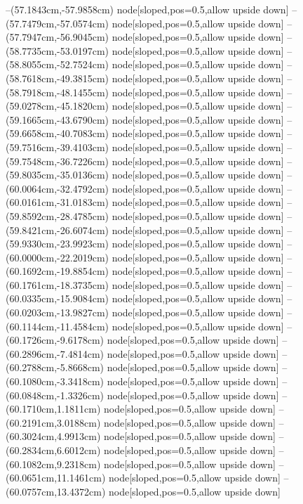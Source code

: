 --(57.1843cm,-57.9858cm) node[sloped,pos=0.5,allow upside down]{\ArrowIn}
--(57.7479cm,-57.0574cm) node[sloped,pos=0.5,allow upside down]{\ArrowIn}
--(57.7947cm,-56.9045cm) node[sloped,pos=0.5,allow upside down]{\arrowIn}
--(58.7735cm,-53.0197cm) node[sloped,pos=0.5,allow upside down]{\ArrowIn}
--(58.8055cm,-52.7524cm) node[sloped,pos=0.5,allow upside down]{\arrowIn}
--(58.7618cm,-49.3815cm) node[sloped,pos=0.5,allow upside down]{\ArrowIn}
--(58.7918cm,-48.1455cm) node[sloped,pos=0.5,allow upside down]{\ArrowIn}
--(59.0278cm,-45.1820cm) node[sloped,pos=0.5,allow upside down]{\ArrowIn}
--(59.1665cm,-43.6790cm) node[sloped,pos=0.5,allow upside down]{\ArrowIn}
--(59.6658cm,-40.7083cm) node[sloped,pos=0.5,allow upside down]{\ArrowIn}
--(59.7516cm,-39.4103cm) node[sloped,pos=0.5,allow upside down]{\ArrowIn}
--(59.7548cm,-36.7226cm) node[sloped,pos=0.5,allow upside down]{\ArrowIn}
--(59.8035cm,-35.0136cm) node[sloped,pos=0.5,allow upside down]{\ArrowIn}
--(60.0064cm,-32.4792cm) node[sloped,pos=0.5,allow upside down]{\ArrowIn}
--(60.0161cm,-31.0183cm) node[sloped,pos=0.5,allow upside down]{\ArrowIn}
--(59.8592cm,-28.4785cm) node[sloped,pos=0.5,allow upside down]{\ArrowIn}
--(59.8421cm,-26.6074cm) node[sloped,pos=0.5,allow upside down]{\ArrowIn}
--(59.9330cm,-23.9923cm) node[sloped,pos=0.5,allow upside down]{\ArrowIn}
--(60.0000cm,-22.2019cm) node[sloped,pos=0.5,allow upside down]{\ArrowIn}
--(60.1692cm,-19.8854cm) node[sloped,pos=0.5,allow upside down]{\ArrowIn}
--(60.1761cm,-18.3735cm) node[sloped,pos=0.5,allow upside down]{\ArrowIn}
--(60.0335cm,-15.9084cm) node[sloped,pos=0.5,allow upside down]{\ArrowIn}
--(60.0203cm,-13.9827cm) node[sloped,pos=0.5,allow upside down]{\ArrowIn}
--(60.1144cm,-11.4584cm) node[sloped,pos=0.5,allow upside down]{\ArrowIn}
--(60.1726cm,-9.6178cm) node[sloped,pos=0.5,allow upside down]{\ArrowIn}
--(60.2896cm,-7.4814cm) node[sloped,pos=0.5,allow upside down]{\ArrowIn}
--(60.2788cm,-5.8668cm) node[sloped,pos=0.5,allow upside down]{\ArrowIn}
--(60.1080cm,-3.3418cm) node[sloped,pos=0.5,allow upside down]{\ArrowIn}
--(60.0848cm,-1.3326cm) node[sloped,pos=0.5,allow upside down]{\ArrowIn}
--(60.1710cm,1.1811cm) node[sloped,pos=0.5,allow upside down]{\ArrowIn}
--(60.2191cm,3.0188cm) node[sloped,pos=0.5,allow upside down]{\ArrowIn}
--(60.3024cm,4.9913cm) node[sloped,pos=0.5,allow upside down]{\ArrowIn}
--(60.2834cm,6.6012cm) node[sloped,pos=0.5,allow upside down]{\ArrowIn}
--(60.1082cm,9.2318cm) node[sloped,pos=0.5,allow upside down]{\ArrowIn}
--(60.0651cm,11.1461cm) node[sloped,pos=0.5,allow upside down]{\ArrowIn}
--(60.0757cm,13.4372cm) node[sloped,pos=0.5,allow upside down]{\ArrowIn}

